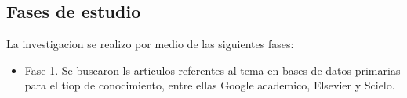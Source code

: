 \subsection{Fases de estudio}

La investigacion se realizo por medio de las siguientes fases:

\begin{itemize}
   \item Fase 1. Se buscaron ls articulos referentes al tema en bases de datos primarias para el tiop de conocimiento, entre ellas Google academico, Elsevier y Scielo.
      
\end{itemize}

%

